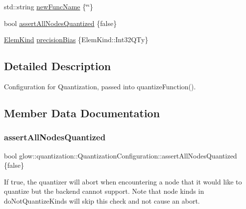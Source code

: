 \begin{DoxyCompactItemize}
std\+::string \hyperlink{structglow_1_1quantization_1_1_quantization_configuration_aa54e327517347c24380917155f2688bd}{new\+Func\+Name} \{\char`\"{}\char`\"{}\}
\item 
bool \hyperlink{structglow_1_1quantization_1_1_quantization_configuration_a47d1c3ee284fdd87954692372c6f3eec}{assert\+All\+Nodes\+Quantized} \{false\}
\item 
\hyperlink{namespaceglow_ab92e14a94329daf4083db670e95fbcdf}{Elem\+Kind} \hyperlink{structglow_1_1quantization_1_1_quantization_configuration_a898c5586b41bdecc7a1c3505639167e1}{precision\+Bias} \{Elem\+Kind\+::\+Int32\+Q\+Ty\}
\end{DoxyCompactItemize}


\subsection{Detailed Description}
Configuration for Quantization, passed into quantize\+Function(). 

\subsection{Member Data Documentation}
\mbox{\label{structglow_1_1quantization_1_1_quantization_configuration_a47d1c3ee284fdd87954692372c6f3eec}} 
\subsubsection{\texorpdfstring{assert\+All\+Nodes\+Quantized}{assertAllNodesQuantized}}
{\footnotesize\ttfamily bool glow\+::quantization\+::\+Quantization\+Configuration\+::assert\+All\+Nodes\+Quantized \{false\}}

If true, the quantizer will abort when encountering a node that it would like to quantize but the backend cannot support. Note that node kinds in do\+Not\+Quantize\+Kinds will skip this check and not cause an abort. \mbox{\label{structglow_1_1quantization_1_1_quantization_configuration_aef3b75a36b8e5d3ce182f830916a1523}} 

